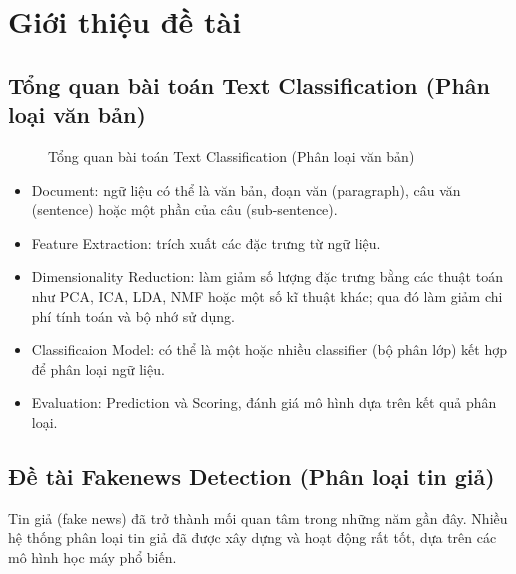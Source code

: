 \documentclass[12pt]{article}
\begin{document}
\begin{titlepage}
\vfill
\end{titlepage}


\tableofcontents
\pagebreak

\section{Giới thiệu đề tài}
\subsection{Tổng quan bài toán Text Classification (Phân loại văn bản)}
\begin{figure}[H]
	\centering
	\caption{Tổng quan bài toán Text Classification (Phân loại văn bản)\cite{Kowsari_2019}}
\end{figure}
\begin{itemize}
\item Document: ngữ liệu có thể là văn bản, đoạn văn (paragraph), câu văn (sentence) hoặc một phần của câu (sub-sentence).
\item Feature Extraction: trích xuất các đặc trưng từ ngữ liệu.
\item Dimensionality Reduction: làm giảm số lượng đặc trưng bằng các thuật toán như PCA, ICA, LDA, NMF hoặc một số kĩ thuật khác\cite{Kowsari_2019}; qua đó làm giảm chi phí tính toán và bộ nhớ sử dụng.
\item Classificaion Model: có thể là một hoặc nhiều classifier (bộ phân lớp) kết hợp để phân loại ngữ liệu.
\item Evaluation: Prediction và Scoring, đánh giá mô hình dựa trên kết quả phân loại.
\end{itemize}

\subsection{Đề tài Fakenews Detection (Phân loại tin giả)}
Tin giả (fake news) đã trở thành mối quan tâm trong những năm gần đây. Nhiều hệ thống phân loại tin giả đã được xây dựng và hoạt động rất tốt, dựa trên các mô hình học máy phổ biến.
\end{document}
